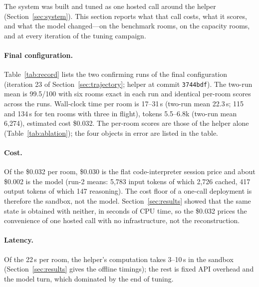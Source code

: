 \documentclass[10pt,a4paper]{article}
\begin{document}
The system was built and tuned as one hosted call around the helper (Section~\ref{sec:system}). This section reports what that call costs, what it scores, and what the model changed---on the benchmark rooms, on the capacity rooms, and at every iteration of the tuning campaign.

\paragraph{Final configuration.}
Table~\ref{tab:record} lists the two confirming runs of the final configuration (iteration 23 of Section~\ref{sec:trajectory}; helper at commit \texttt{3744bdf}). The two-run mean is 99.5/100 with six rooms exact in each run and identical per-room scores across the runs. Wall-clock time per room is 17--31\,s (two-run mean 22.3\,s; 115 and 134\,s for ten rooms with three in flight), tokens 5.5--6.8k (two-run mean 6,274), estimated cost \$0.032. The per-room scores are those of the helper alone (Table~\ref{tab:ablation}); the four objects in error are listed in the table.

\begin{table}[t]
\centering\small
\caption{Final configuration (\texttt{gpt-5-mini}, reasoning effort \emph{low}, iteration 23, helper commit \texttt{3744bdf}), seeds 101--110, two runs; every room ran one code cell. Time and tokens are run 2 (run-2 means 23.4\,s and 6,200 tokens); time is wall clock with three rooms in flight; tokens are the API's total. Remaining error: attribute errors beyond tolerance under the best assignment and room symmetry (pos in room units; ori in degrees).}
\label{tab:record}

\end{table}

\paragraph{Cost.}
Of the \$0.032 per room, \$0.030 is the flat code-interpreter session price and about \$0.002 is the model (run-2 means: 5,783 input tokens of which 2,726 cached, 417 output tokens of which 147 reasoning). The cost floor of a one-call deployment is therefore the sandbox, not the model. Section~\ref{sec:results} showed that the same state is obtained with neither, in seconds of CPU time, so the \$0.032 prices the convenience of one hosted call with no infrastructure, not the reconstruction.

\paragraph{Latency.}
Of the 22\,s per room, the helper's computation takes 3--10\,s in the sandbox (Section~\ref{sec:results} gives the offline timings); the rest is fixed API overhead and the model turn, which dominated by the end of tuning.
\end{document}
